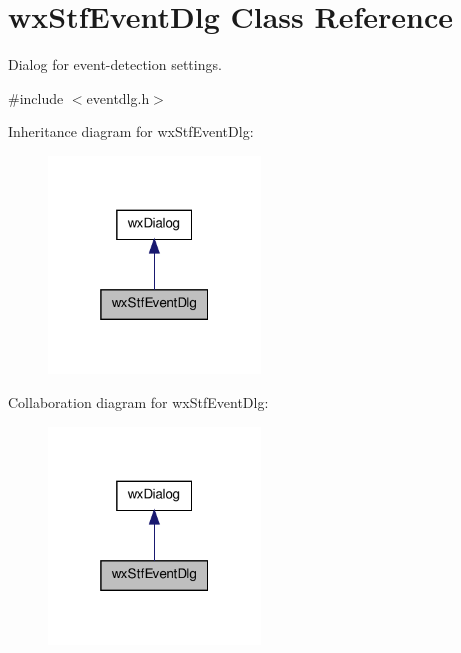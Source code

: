 \hypertarget{classwxStfEventDlg}{
\section{wxStfEventDlg Class Reference}
\label{classwxStfEventDlg}
}


Dialog for event-\/detection settings.  




{\ttfamily \#include $<$eventdlg.h$>$}



Inheritance diagram for wxStfEventDlg:
\nopagebreak
\begin{figure}[H]
\begin{center}
\leavevmode
\includegraphics[width=160pt]{classwxStfEventDlg__inherit__graph}
\end{center}
\end{figure}


Collaboration diagram for wxStfEventDlg:
\nopagebreak
\begin{figure}[H]
\begin{center}
\leavevmode
\includegraphics[width=160pt]{classwxStfEventDlg__coll__graph}
\end{center}
\end{figure}
